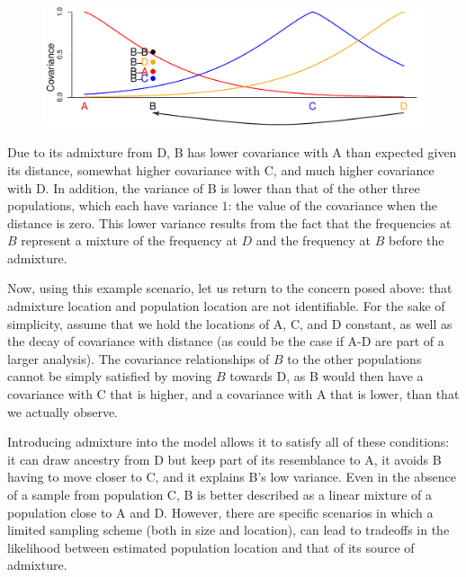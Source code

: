 \documentclass[12pt]{article}
\begin{document}
\begin{figure}[htp!]
	\centering
	\includegraphics[width=\textwidth]{figs/sims/Admix_covar_toy_fig.pdf}
	\caption{} \label{sfig:toy_admixture}
\end{figure}

Due to its admixture from D, B has lower covariance with A than expected given its distance, somewhat higher covariance with C, and much higher covariance with D. In addition, the variance of B is lower than that of the other three populations, which each have variance $1$: the value of the covariance when the distance is zero. This lower variance results from the fact that the frequencies at $B$ represent a mixture of the frequency at $D$ and the frequency at $B$ before the admixture. 

Now, using this example scenario, let us return to the concern posed above: that admixture location and population location are not identifiable.  For the sake of simplicity, assume that we hold the locations of A, C, and D constant, as well as the decay of covariance with distance (as could be the case if A-D are part of a larger analysis).  The covariance relationships of $B$ to the other populations cannot be simply satisfied by moving $B$ towards D, as B would then have a covariance with C that is higher, and a covariance with A that is lower, than that we actually observe. 

Introducing admixture into the model allows it to satisfy all of these conditions: it can draw ancestry from D but keep part of its resemblance to A, it avoids B having to move closer to C, and it explains B's low variance.  Even in the absence of a sample from population C, B is better described as a linear mixture of a population close to A and D.  However, there are specific scenarios in which a limited sampling scheme (both in size and location), can lead to tradeoffs in the likelihood between estimated population location and that of its source of admixture.
\end{document}
